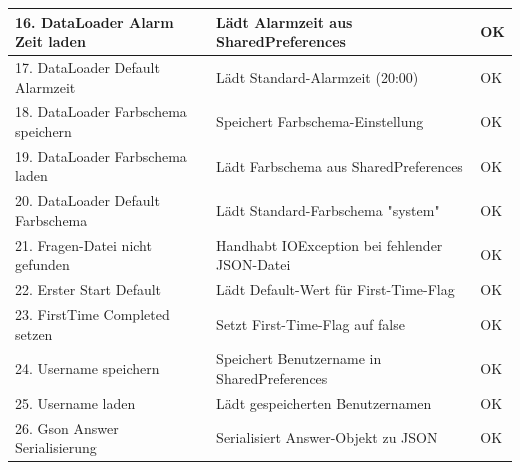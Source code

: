 \documentclass[a4paper,12pt]{article}
\begin{document}
\begin{tabularx}{\textwidth}{|l|X|l|}
\hline
16. DataLoader Alarm Zeit laden & Lädt Alarmzeit aus SharedPreferences & OK \\
\hline
17. DataLoader Default Alarmzeit & Lädt Standard-Alarmzeit (20:00) & OK \\
\hline
18. DataLoader Farbschema speichern & Speichert Farbschema-Einstellung & OK \\
\hline
19. DataLoader Farbschema laden & Lädt Farbschema aus SharedPreferences & OK \\
\hline
20. DataLoader Default Farbschema & Lädt Standard-Farbschema "system" & OK \\
\hline
21. Fragen-Datei nicht gefunden & Handhabt IOException bei fehlender JSON-Datei & OK \\
\hline
22. Erster Start Default & Lädt Default-Wert für First-Time-Flag & OK \\
\hline
23. FirstTime Completed setzen & Setzt First-Time-Flag auf false & OK \\
\hline
24. Username speichern & Speichert Benutzername in SharedPreferences & OK \\
\hline
25. Username laden & Lädt gespeicherten Benutzernamen & OK \\
\hline
26. Gson Answer Serialisierung & Serialisiert Answer-Objekt zu JSON & OK \\
\hline
\end{tabularx}
\end{document}
